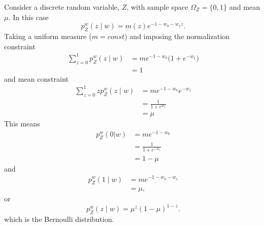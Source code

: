\begin{example}
	Consider a discrete random variable, $Z$, with sample space $\Omega_Z= \{0,1\}$ and mean $\mu$. In this case
	\begin{equation}
		p_{Z}^w(z \mid w) = m(z) e^{-1-w_0 - w_1 z}.
	\end{equation}
	Taking a uniform measure ($m= const$) and imposing the normalization constraint
	\begin{equation}
		\begin{split}
			\sum_{z=0}^1 p_{Z}^w(z\mid w) &=m e^{-1-w_0}\bigg(1+ e^{- w_1}\bigg)\\
			&=1
		\end{split}
	\end{equation}
	and mean constraint
	\begin{equation}
		\begin{split}
			\sum_{z=0}^1 zp_{Z}^w(z \mid w) &=m e^{-1-w_0}e^{- w_1}\\
			& = \frac{1}{1+ e^{w_1}}\\
			&=\mu
		\end{split}
	\end{equation}
	This means
	\begin{equation}
		\begin{split}
			p_{Z}^w(0|w) &= m e^{-1-w_0}\\
			&= \frac{1}{1+ e^{- w_1}}\\
			& = 1-\mu
		\end{split}
	\end{equation}	
	and
	\begin{equation}
		\begin{split}
			p_{Z}^w(1\mid w) &= m e^{-1-w_0-w_1}\\
			&=\mu,
		\end{split}
	\end{equation}
	or 
	\begin{equation}
		p_{Z}^w(z\mid w) = \mu^z (1-\mu)^{1-z}.
	\end{equation}
	which is the Bernoulli distribution.
\end{example}

